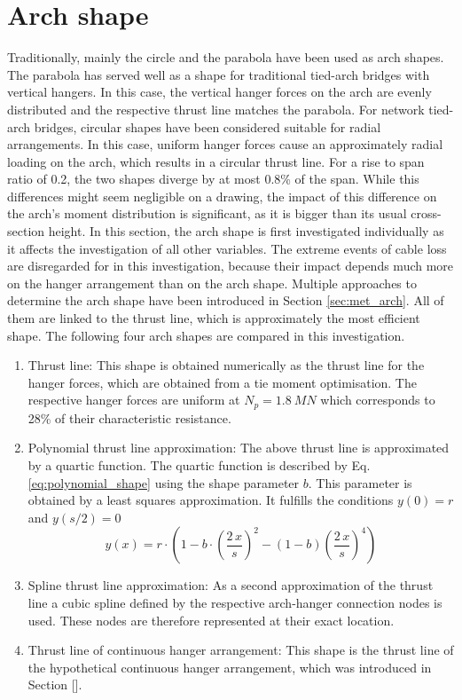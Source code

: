 \newpage
\section{Arch shape} \label{sec:arch_shape}
Traditionally, mainly the circle and the parabola have been used as arch shapes. The parabola has served well as a shape for traditional tied-arch bridges with vertical hangers. In this case, the vertical hanger forces on the arch are evenly distributed and the respective thrust line matches the parabola. For network tied-arch bridges, circular shapes have been considered suitable for radial arrangements. In this case, uniform hanger forces cause an approximately radial loading on the arch, which results in a circular thrust line. For a rise to span ratio of 0.2, the two shapes diverge by at most 0.8\% of the span. While this differences might seem negligible on a drawing, the impact of this difference on the arch's moment distribution is significant, as it is bigger than its usual cross-section height. In this section, the arch shape is first investigated individually as it affects the investigation of all other variables. The extreme events of cable loss are disregarded for in this investigation, because their impact depends much more on the hanger arrangement than on the arch shape.
Multiple approaches to determine the arch shape have been introduced in Section \ref{sec:met_arch}. All of them are linked to the thrust line, which is approximately the most efficient shape. The following four arch shapes are compared in this investigation.
\begin{enumerate}
    \item Thrust line: This shape is obtained numerically as the thrust line for the hanger forces, which are obtained from a tie moment optimisation. The respective hanger forces are uniform at $N_p=\SI{1.8}{MN}$ which corresponds to 28\% of their characteristic resistance.
    \item Polynomial thrust line approximation: The above thrust line is approximated by a quartic function. The quartic function is described by Eq. \eqref{eq:polynomial_shape} using the shape parameter $b$. This parameter is obtained by a least squares approximation. It fulfills the conditions $y(0)=r$ and $y(s/2)=0$
    \begin{equation}
        y(x)=r \cdot \left(1 - b \cdot \left(\frac{2\,x}{s}\right)^2 - (1-b) \left(\frac{2\,x}{s}\right)^4 \right)
        \label{eq:polynomial_shape}
    \end{equation}
    \item Spline thrust line approximation: As a second approximation of the thrust line a cubic spline defined by the respective arch-hanger connection nodes is used. These nodes are therefore represented at their exact location.
    \item Thrust line of continuous hanger arrangement: This shape is the thrust line of the hypothetical continuous hanger arrangement, which was introduced in Section [].
\end{enumerate}

